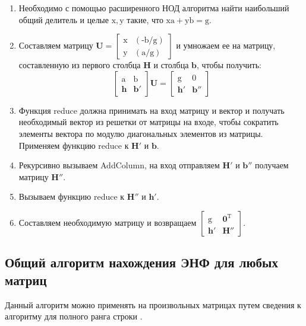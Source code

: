 \begin{enumerate}
\item Необходимо с помощью расширенного НОД алгоритма найти наибольший общий делитель и целые $ \mathrm{x, y} $ такие, что $ \mathrm{xa + yb = g} $.
\item Составляем матрицу $ \mathbf{U}= \left[\begin{array}{cccc}
\mathrm{x} & \mathrm{(\text{-}b/g)} \\
\mathrm{y} & \mathrm{(a/g)} \end{array}\right] $ и умножаем ее на матрицу, составленную из первого столбца $ \mathbf{H} $ и столбца $ \mathbf{b} $, чтобы получить:
$$ \left[\begin{array}{cccc}
\mathrm{a} & \mathrm{b} \\
\mathbf{h} & \mathbf{b}' \end{array}\right] \mathbf{U}=
\left[\begin{array}{cccc}
\mathrm{g} & \mathrm{0} \\
\mathbf{h}' & \mathbf{b}'' \end{array}\right] $$
\item Функция reduce должна принимать на вход матрицу и вектор и получать необходимый вектор из решетки от матрицы на входе, чтобы сократить элементы вектора по модулю диагональных элементов из матрицы. Применяем функцию reduce к $ \mathbf{H}' $ и $ \mathbf{b} $.
\item Рекурсивно вызываем AddColumn, на вход отправляем $ \mathbf{H}' $ и $ \mathbf{b}'' $  получаем матрицу $ \mathbf{H}'' $.
\item Вызываем функцию reduce к $ \mathbf{H}'' $ и $ \mathbf{h}' $.
\item Составляем необходимую матрицу и возвращаем $ \left[\begin{array}{cccc}
\mathrm{g} & \mathbf{0}^\mathrm{T} \\
\mathbf{h}' & \mathbf{H}'' \end{array}\right] $.
\end{enumerate}

\subsection{Общий алгоритм нахождения ЭНФ для любых матриц}

Данный алгоритм можно применять на произвольных матрицах путем сведения к алгоритму для полного ранга строки \cite{lec4}.

